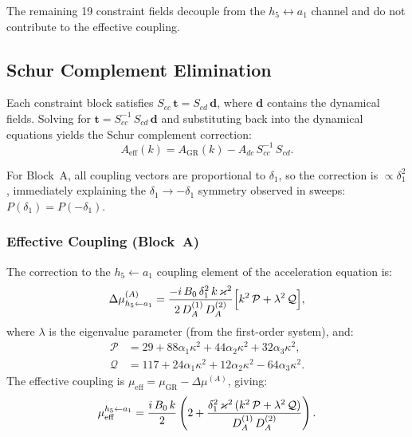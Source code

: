 The remaining 19 constraint fields decouple from the $h_5 \leftrightarrow a_1$ channel and do not contribute to the effective coupling.

\subsection{Schur Complement Elimination}
\label{subsec:schur-complement}

Each constraint block satisfies $S_{cc}\, \mathbf{t} = S_{cd}\, \mathbf{d}$, where $\mathbf{d}$ contains the dynamical fields. Solving for $\mathbf{t} = S_{cc}^{-1}\, S_{cd}\, \mathbf{d}$ and substituting back into the dynamical equations yields the Schur complement correction:
\begin{equation}
  A_{\text{eff}}(k) = A_{\text{GR}}(k) - A_{dc}\, S_{cc}^{-1}\, S_{cd}.
  \label{eq:schur-complement}
\end{equation}

For Block~A, all coupling vectors are proportional to $\delta_1$, so the correction is $\propto \delta_1^2$, immediately explaining the $\delta_1 \to -\delta_1$ symmetry observed in sweeps: $P(\delta_1) = P(-\delta_1)$.

\subsubsection{Effective Coupling (Block~A)}
\label{subsec:effective-coupling-a}

The correction to the $h_5 \leftarrow a_1$ coupling element of the acceleration equation is:
\begin{equation}
  \Delta\mu^{(A)}_{h_5 \leftarrow a_1} = \frac{-i\,B_0\,\delta_1^2\,k\,\varkappa^2}{2\, D_A^{(1)}\, D_A^{(2)}}
  \Bigl[
    k^2\, \mathcal{P}
    + \lambda^2\, \mathcal{Q}
  \Bigr],
  \label{eq:coupling-shift-a}
\end{equation}
where $\lambda$ is the eigenvalue parameter (from the first-order system), and:
\begin{align}
  \mathcal{P} &= 29 + 88\alpha_1\kappa^2 + 44\alpha_2\kappa^2 + 32\alpha_3\kappa^2, \\
  \mathcal{Q} &= 117 + 24\alpha_1\kappa^2 + 12\alpha_2\kappa^2 - 64\alpha_3\kappa^2.
\end{align}
The effective coupling is $\mu_{\text{eff}} = \mu_{\text{GR}} - \Delta\mu^{(A)}$, giving:
\begin{equation}
  \mu_{\text{eff}}^{h_5 \leftarrow a_1} = \frac{i\,B_0\,k}{2}
  \left(
    2 + \frac{\delta_1^2\,\varkappa^2\,(k^2\,\mathcal{P} + \lambda^2\,\mathcal{Q})}{D_A^{(1)}\, D_A^{(2)}}
  \right).
  \label{eq:mu-eff-h5a1}
\end{equation}

